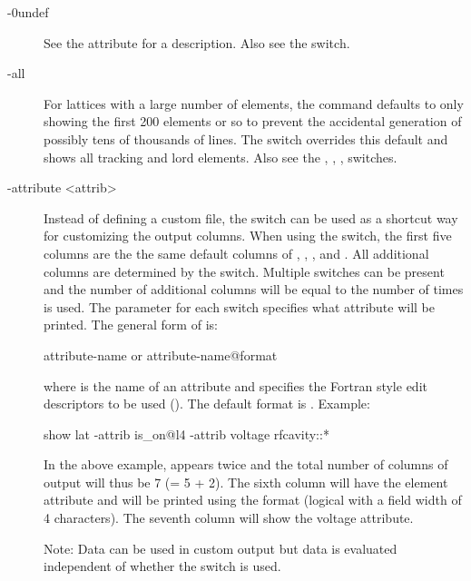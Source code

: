 {{{{{{{{\begin{description}
\item[-0undef] \Newline
See the  attribute for a description. Also see the  switch.
%
\item[-all] \Newline
For lattices with a large number of elements, the  command defaults to only showing
the first 200 elements or so to prevent the accidental generation of possibly tens of thousands of
lines. The  switch overrides this default and shows all tracking and lord elements. Also
see the , , ,  switches.
%
\item[-attribute <attrib>] \Newline
Instead of defining a custom file, the  switch can be used as a shortcut way
for customizing the output columns.  When using the  switch, the first five columns
are the the same default columns of , , ,  and
. All additional columns are determined by the  switch. Multiple
 switches can be present and the number of additional columns will be equal to the
number of times  is used.  The  parameter for each 
switch specifies what attribute will be printed.  The general form of  is:
\begin{example}
  attribute-name         or
  attribute-name@format
\end{example}
where  is the name of an attribute and  specifies the Fortran style
edit descriptors to be used (). The default format is .  Example:
\begin{example}
  show lat -attrib is_on@l4 -attrib voltage rfcavity::*
\end{example}
In the above example,  appears twice and the total number of columns of output will
thus be 7 (= 5 + 2). The sixth column will have the  element attribute and will be printed
using the  format (logical with a field width of 4 characters). The seventh column will show
the voltage attribute.

Note: Data can be used in custom output but data is evaluated independent of whether the
 switch is used.


\end{description}}}}}}}}}
